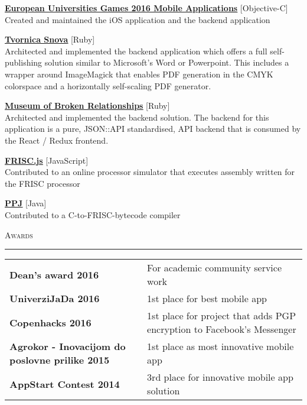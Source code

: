 \documentclass[10pt, a4paper, final, onecolumn, oneside, notitlepage]{article}
\newcommand{\sectionspacing}[0]{ \vspace{10pt} } %
\newcommand{\sectionrule}[0]{ \rule[6pt]{\textwidth}{0.5pt} } %
\renewcommand{\section}[1]{\sectionspacing {\large \scshape #1} \sectionrule}
\begin{document}
\begin{center}
\begin{flushleft}
\textbf{\href{https://itunes.apple.com/us/app/eug-2016/id1126963997?mt=8}{\underline{European Universities Games 2016 Mobile Applications}}} [Objective-C]\\
Created and maintained the iOS application and the backend application \\
\vspace{2mm}

\textbf{\href{https://tvornica-snova.hr}{\underline{Tvornica Snova}}} [Ruby]\\
Architected and implemented the backend application which offers a full
self-publishing solution similar to Microsoft's Word or Powerpoint.
This includes a wrapper around ImageMagick that enables PDF generation in the
CMYK colorspace and a horizontally self-scaling PDF generator. \\
\vspace{2mm}

\textbf{\href{https://brokenships.com}{\underline{Museum of Broken Relationships}}} [Ruby]\\
Architected and implemented the backend solution. The backend for this application
is a pure, JSON::API standardised, API backend that is consumed by the
React / Redux frontend. \\
\vspace{2mm}

\textbf{\href{https://github.com/izuzak/FRISCjs}{\underline{FRISC.js}}} [JavaScript]\\
Contributed to an online processor simulator that executes assembly written for
the FRISC processor \\
\vspace{2mm}

\textbf{\href{https://github.com/Stankec/PPJ}{\underline{PPJ}}} [Java]\\
Contributed to a C-to-FRISC-bytecode compiler \\
\end{flushleft}


\section{Awards}
\begin{tabular}{ >{\hfill}p{} p{} }
\textbf{Dean's award 2016} & For academic community service work \\
\textbf{UniverziJaDa 2016} & 1st place for best mobile app \\
\textbf{Copenhacks 2016} & 1st place for project that adds PGP encryption to
Facebook's Messenger \\
\textbf{Agrokor - Inovacijom do poslovne prilike 2015} & 1st place as most
innovative mobile app \\
\textbf{AppStart Contest 2014} & 3rd place for innovative mobile app solution \\
\end{tabular}



\end{center}
\end{document}
